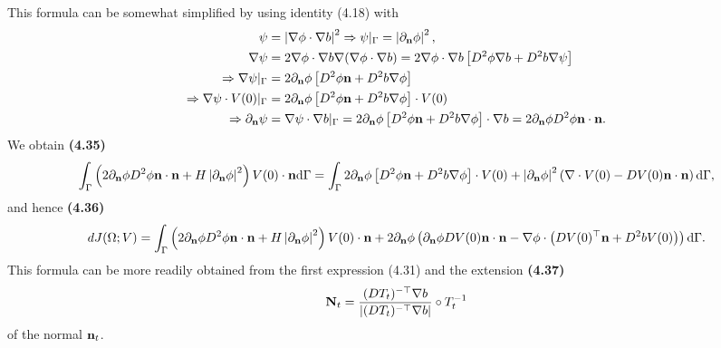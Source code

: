 \documentclass[oneside]{book}
\numberwithin{equation}{section}
\begin{document}
This formula can be somewhat simplified by using identity (4.18) with
\begin{align*}
    \psi &= \left|\nabla\phi\cdot\nabla b\right|^2\Rightarrow\psi|_\Gamma = \left|\partial_{\bf n}\phi\right|^2,\\
    \nabla\psi &= 2\nabla\phi\cdot\nabla b\nabla(\nabla\phi\cdot\nabla b) = 2\nabla\phi\cdot\nabla b\left[D^2\phi\nabla b + D^2b\nabla\psi\right]\\
    \Rightarrow\nabla\psi|_\Gamma &= 2\partial_{\bf n}\phi\left[D^2\phi{\bf n} + D^2b\nabla\phi\right]\\
    \Rightarrow\nabla\psi\cdot V(0)|_\Gamma &= 2\partial_{\bf n}\phi\left[D^2\phi{\bf n} + D^2b\nabla\phi\right]\cdot V(0)\\
    \Rightarrow\partial_{\bf n}\psi &= \nabla\psi\cdot\nabla b|_\Gamma = 2\partial_{\bf n}\phi\left[D^2\phi{\bf n} + D^2b\nabla\phi\right]\cdot\nabla b = 2\partial_{\bf n}\phi D^2\phi{\bf n}\cdot{\bf n}.
\end{align*}
We obtain \textbf{(4.35)}
\begin{align*}
    \int_\Gamma \left(2\partial_{\bf n}\phi D^2\phi{\bf n}\cdot{\bf n} + H\left|\partial_{\bf n}\phi\right|^2\right)V(0)\cdot{\bf n}{\rm d}\Gamma = \int_\Gamma 2\partial_{\bf n}\phi\left[D^2\phi{\bf n} + D^2b\nabla\phi\right]\cdot V(0) + \left|\partial_{\bf n}\phi\right|^2\left(\nabla\cdot V(0) - DV(0){\bf n}\cdot{\bf n}\right){\rm d}\Gamma,
\end{align*}
and hence \textbf{(4.36)}
\begin{align*}
    dJ(\Omega;V) = \int_\Gamma \left(2\partial_{\bf n}\phi D^2\phi{\bf n}\cdot{\bf n} + H\left|\partial_{\bf n}\phi\right|^2\right)V(0)\cdot{\bf n} + 2\partial_{\bf n}\phi\left(\partial_{\bf n}\phi DV(0){\bf n}\cdot{\bf n} - \nabla\phi\cdot\left(DV(0)^\top{\bf n} + D^2bV(0)\right)\right){\rm d}\Gamma.
\end{align*}
This formula can be more readily obtained from the first expression (4.31) and the extension \textbf{(4.37)}
\begin{align*}
    {\bf N}_t = \frac{(DT_t)^{-\top}\nabla b}{\left|(DT_t)^{-\top}\nabla b\right|}\circ T_t^{-1}
\end{align*}
of the normal ${\bf n}_t$.
\end{document}

